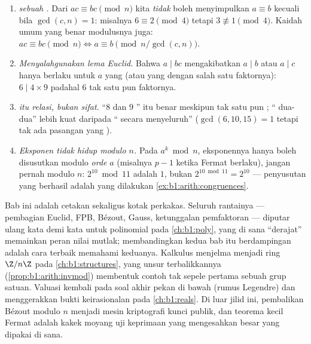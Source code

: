 \begin{remark}\label{rem:b1:arith:pitfalls}
\begin{enumerate}
  \item \emph{ sebuah .} Dari $ac \equiv bc \pmod n$
        kita \emph{tidak} boleh menyimpulkan $a \equiv b$ kecuali bila $\gcd(c,
        n) = 1$: misalnya $6 \equiv 2 \pmod 4$ tetapi $3 \not\equiv 1 \pmod
        4$. Kaidah umum yang benar  modulusnya juga: $ac
        \equiv bc \pmod n \iff a \equiv b \pmod{n/\gcd(c,n)}$.
  \item \emph{Menyalahgunakan lema Euclid.} Bahwa $a \mid bc$ mengakibatkan $a
        \mid b$ atau $a \mid c$ hanya berlaku untuk $a$ yang \emph{} (atau
        yang  dengan salah satu faktornya): $6 \mid 4 \times 9$ padahal $6$
        tak  satu pun faktornya.
  \item \emph{ itu relasi, bukan sifat.} ``$8$ dan
        $9$ '' itu benar meskipun tak satu pun ;
        `` dua-dua'' lebih kuat daripada ``
        secara menyeluruh'' ($\gcd(6, 10, 15) = 1$ tetapi tak ada pasangan yang
        ).
  \item \emph{Eksponen tidak hidup modulo $n$.} Pada $a^k \bmod n$,
        eksponennya hanya boleh disusutkan modulo \emph{orde}
        $a$ (misalnya $p - 1$ ketika Fermat berlaku), jangan pernah
        modulo $n$: $2^{10} \bmod 11$ adalah $1$, bukan $2^{10 \bmod
        11} = 2^{10}$ --- penyusutan yang berhasil adalah yang
        dilakukan \cref{ex:b1:arith:congruences}.
\end{enumerate}
\end{remark}

\begin{remark}\label{rem:b1:arith:whereused}
Bab ini adalah cetakan sekaligus kotak perkakas. Seluruh rantainya
--- pembagian Euclid, FPB, Bézout, Gauss, ketunggalan pemfaktoran
--- diputar ulang kata demi kata untuk polinomial pada \cref{ch:b1:poly},
yang di sana ``derajat'' memainkan peran nilai mutlak; membandingkan
kedua bab itu berdampingan adalah cara terbaik memahami keduanya.
Kalkulus  menjelma menjadi ring $\Z/n\Z$ pada
\cref{ch:b1:structures}, yang unsur terbalikkannya
(\cref{prop:b1:arith:invmod}) membentuk contoh tak sepele pertama
sebuah grup satuan. Valuasi kembali pada soal akhir pekan di bawah
(rumus Legendre) dan menggerakkan bukti keirasionalan pada
\cref{ch:b1:reals}. Di luar jilid ini, pembalikan Bézout modulo $n$
menjadi mesin kriptografi kunci publik, dan teorema kecil Fermat
adalah kakek moyang uji keprimaan yang mengesahkan 
besar yang dipakai di sana.
\end{remark}

